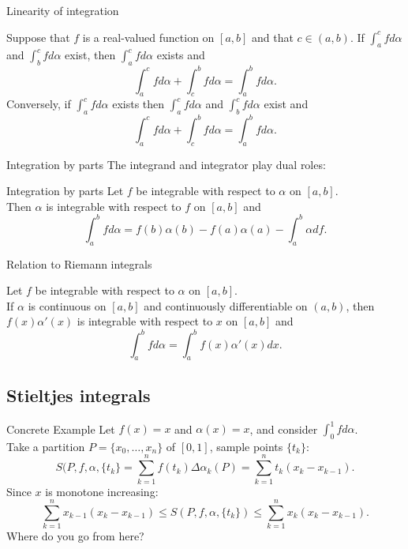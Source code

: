 \documentclass{beamer}
\begin{document}
\begin{frame}{Linearity of integration}
\begin{thm}
Suppose that $f$ is a real-valued function on $[a,b]$ and that $c\in (a,b)$.
\pause
If $\int_a^c fd\alpha$ and $\int_b^c fd\alpha$ exist, then $\int_a^cfd\alpha$ exists and
$$\int_a^c fd\alpha + \int_c^b fd\alpha = \int_a^b fd\alpha.$$
\pause
Conversely, if $\int_a^c fd\alpha$ exists then $\int_a^c fd\alpha$ and $\int_b^c fd\alpha$ exist and
$$\int_a^c fd\alpha + \int_c^b fd\alpha = \int_a^b fd\alpha.$$
\end{thm}
\end{frame}

\begin{frame}{Integration by parts}
The integrand and integrator play dual roles:
\begin{thm}{Integration by parts}
Let $f$ be integrable with respect to $\alpha$ on $[a,b]$.\\
Then $\alpha$ is integrable with respect to $f$ on $[a,b]$ and
$$\int_a^b f d\alpha = f(b)\alpha(b)-f(a)\alpha(a)-\int_a^b \alpha df.$$
\end{thm}
\end{frame}

\begin{frame}{Relation to Riemann integrals}
\begin{thm}
Let $f$ be integrable with respect to $\alpha$ on $[a,b]$.\\
If $\alpha$ is continuous on $[a,b]$ and continuously differentiable on $(a,b)$, then
$f(x)\alpha'(x)$ is integrable with respect to $x$ on $[a,b]$ and
$$\int_a^b f d\alpha = \int_a^bf(x)\alpha'(x)dx.$$
\end{thm}
\end{frame}

\subsection{Stieltjes integrals}

\begin{frame}{Concrete Example}
Let $f(x) = x$ and $\alpha(x) =x$, and consider $\int_0^1 f d\alpha$.\\
\pause
Take a partition $P = \{x_0,\dots,x_n\}$ of $[0,1]$, sample points $\{t_k\}$:
$$S(P,f,\alpha,\{t_k\} = \sum_{k=1}^n f(t_k)\Delta \alpha_k(P) = \sum_{k=1}^n t_k(x_k-x_{k-1}).$$
\pause
Since $x$ is monotone increasing:
$$\sum_{k=1}^n x_{k-1}(x_k-x_{k-1})\leq S(P,f,\alpha,\{t_k\}) \leq \sum_{k=1}^n x_k(x_k-x_{k-1}).$$
\pause
\hfil {\color{red}Where do you go from here?}
\end{frame}
\end{document}
